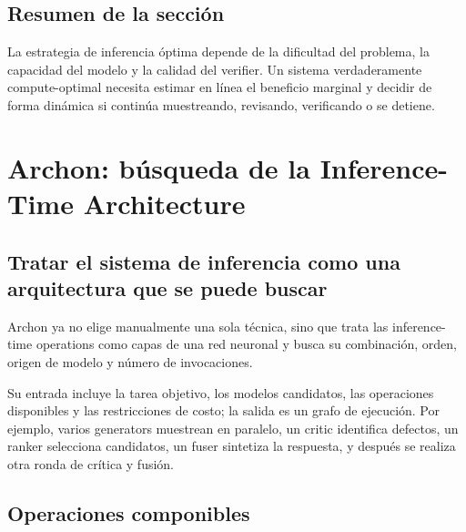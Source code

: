 \documentclass[a4paper]{article}
\begin{document}
\subsection{Resumen de la sección}

La estrategia de inferencia óptima depende de la dificultad del problema, la capacidad del modelo y la calidad del verifier. Un sistema verdaderamente compute-optimal necesita estimar en línea el beneficio marginal y decidir de forma dinámica si continúa muestreando, revisando, verificando o se detiene.
\section{Archon: búsqueda de la Inference-Time Architecture}

\subsection{Tratar el sistema de inferencia como una arquitectura que se puede buscar}

Archon ya no elige manualmente una sola técnica, sino que trata las inference-time operations como capas de una red neuronal y busca su combinación, orden, origen de modelo y número de invocaciones.


Su entrada incluye la tarea objetivo, los modelos candidatos, las operaciones disponibles y las restricciones de costo; la salida es un grafo de ejecución. Por ejemplo, varios generators muestrean en paralelo, un critic identifica defectos, un ranker selecciona candidatos, un fuser sintetiza la respuesta, y después se realiza otra ronda de crítica y fusión.

\subsection{Operaciones componibles}

\end{document}
